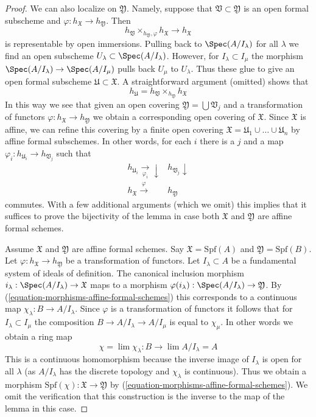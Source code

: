 \begin{proof}
\medskip\noindent
We can also localize on $\mathfrak Y$.
Namely, suppose that $\mathfrak V \subset \mathfrak Y$ is an
open formal subscheme and $\varphi : h_\mathfrak X \to h_\mathfrak Y$.
Then
$$
h_\mathfrak V \times_{h_\mathfrak Y, \varphi} h_\mathfrak X \to h_\mathfrak X
$$
is representable by open immersions. Pulling back to
$\Spec(A/I_\lambda)$ for all $\lambda$ we find an open subscheme
$U_\lambda \subset \Spec(A/I_\lambda)$. However, for
$I_\lambda \subset I_\mu$ the morphism $\Spec(A/I_\lambda) \to \Spec(A/I_\mu)$
pulls back $U_\mu$ to $U_\lambda$. Thus these glue to give
an open formal subscheme $\mathfrak U \subset \mathfrak X$.
A straightforward argument (omitted) shows that
$$
h_\mathfrak U = h_\mathfrak V \times_{h_\mathfrak Y} h_\mathfrak X
$$
In this way we see that given an open covering
$\mathfrak Y = \bigcup \mathfrak V_j$ and a transformation
of functors $\varphi :  h_\mathfrak X \to h_\mathfrak Y$
we obtain a corresponding open covering of $\mathfrak X$.
Since $\mathfrak X$ is affine, we can refine this covering by
a finite open covering
$\mathfrak X = \mathfrak U_1 \cup \ldots \cup \mathfrak U_n$
by affine formal subschemes. In other words, for each $i$ there
is a $j$ and a map $\varphi_i : h_{\mathfrak U_i} \to h_{\mathfrak V_j}$
such that
$$
\begin{array}{cc}h_{\mathfrak U_i} \underset{\varphi_i}{\longrightarrow}\downarrow & h_{\mathfrak V_j} \downarrow \\ h_{\mathfrak X} \overset{\varphi}{\longrightarrow} & h_\mathfrak Y\end{array}
$$
commutes. With a few additional arguments (which we omit) this implies
that it suffices to prove the bijectivity of the lemma in case
both $\mathfrak X$ and $\mathfrak Y$ are affine formal schemes.

\medskip\noindent
Assume $\mathfrak X$ and $\mathfrak Y$ are affine formal schemes.
Say $\mathfrak X = \text{Spf}(A)$ and $\mathfrak Y = \text{Spf}(B)$.
Let $\varphi : h_\mathfrak X \to h_\mathfrak Y$ be a transformation
of functors. Let $I_\lambda \subset A$ be a fundamental system of
ideals of definition. The canonical inclusion morphism
$i_\lambda : \Spec(A/I_\lambda) \to \mathfrak X$ maps to a morphism
$\varphi(i_\lambda) : \Spec(A/I_\lambda) \to \mathfrak Y$.
By (\ref{equation-morphisms-affine-formal-schemes}) this corresponds
to a continuous map $\chi_\lambda : B \to A/I_\lambda$.
Since $\varphi$ is a transformation of functors it follows
that for $I_\lambda \subset I_\mu$ the composition
$B \to A/I_\lambda \to A/I_\mu$ is equal to $\chi_\mu$.
In other words we obtain a ring map
$$
\chi = \lim \chi_\lambda : B \longrightarrow \lim A/I_\lambda = A
$$
This is a continuous homomorphism because the inverse image
of $I_\lambda$ is open for all $\lambda$ (as $A/I_\lambda$ has the discrete
topology and $\chi_\lambda$ is continuous). Thus we obtain
a morphism $\text{Spf}(\chi) : \mathfrak X \to \mathfrak Y$ by
(\ref{equation-morphisms-affine-formal-schemes}).
We omit the verification that this construction is the inverse
to the map of the lemma in this case.


\end{proof}

